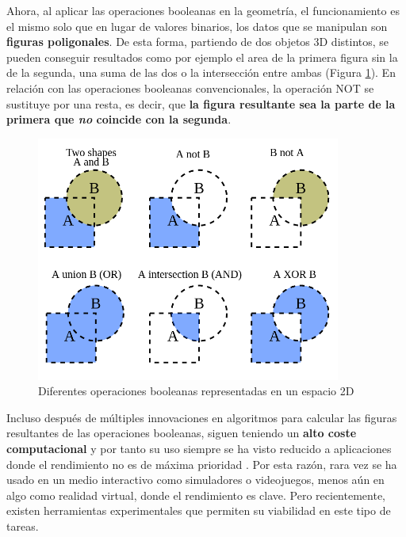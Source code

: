 Ahora, al aplicar las operaciones booleanas en la geometría, el funcionamiento es el mismo solo que en lugar de valores binarios, los datos que se manipulan son \textbf{figuras poligonales}. De esta forma, partiendo de dos objetos 3D distintos, se pueden conseguir resultados como por ejemplo el area de la primera figura sin la de la segunda, una suma de las dos o la intersección entre ambas (Figura \ref{fig:operacionesbooleanas}). En relación con las operaciones booleanas convencionales, la operación NOT se sustituye por una resta, es decir, que \textbf{la figura resultante sea la parte de la primera que \textit{no} coincide con la segunda}.

\begin{figure}[H]
	\centering
	\includegraphics[width=10cm]{imagenes/operacionesbooleanas}
	\caption{Diferentes operaciones booleanas representadas en un espacio 2D}
	\label{fig:operacionesbooleanas}
\end{figure}

Incluso después de múltiples innovaciones en algoritmos para calcular las figuras resultantes de las operaciones booleanas, siguen teniendo un \textbf{alto coste computacional} y por tanto su uso siempre se ha visto reducido a aplicaciones donde el rendimiento no es de máxima prioridad \cite{boolean_operations}. Por esta razón, rara vez se ha usado en un medio interactivo como simuladores o videojuegos, menos aún en algo como realidad virtual, donde el rendimiento es clave. Pero recientemente, existen herramientas experimentales que permiten su viabilidad en este tipo de tareas.

